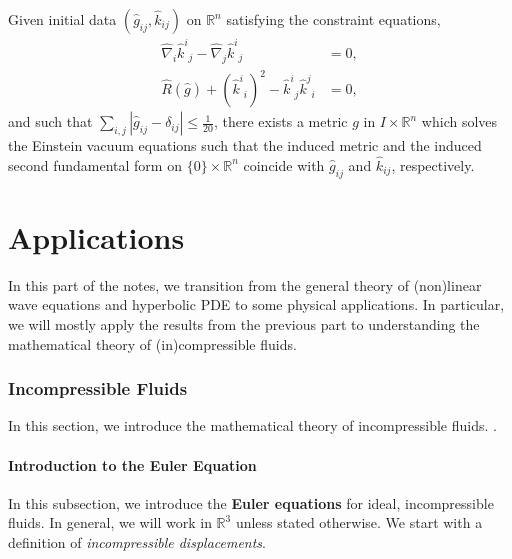 \documentclass{article}
\begin{document}
\begin{theorem}
	Given initial data $(\hat{g}_{ij}, \hat{k}_{ij})$ on $\mathbb{R}^{n}$ satisfying the constraint equations, 
	\begin{equation}
		\begin{alignedat}{1}
			\hat{\nabla}_{i}{\hat{k}^{i}}_{j} - \hat{\nabla}_{j}{\hat{k}^{i}}_{j} &= 0, \\
			\hat{R}(\hat{g}) + ({\hat{k}^{i}}_{i})^{2} - {\hat{k}^{i}}_{j}{\hat{k}^{j}}_{i} &= 0,
		\end{alignedat} 
	\end{equation}
	and such that $\sum_{i,j}|\hat{g}_{ij} - \delta_{ij}| \leq \frac{1}{20}$, there exists a metric $g$ in $I \times \mathbb{R}^{n}$ which solves the Einstein vacuum equations such that the induced metric and the induced second fundamental form on $\{0\} \times \mathbb{R}^{n}$ coincide with $\hat{g}_{ij}$ and $\hat{k}_{ij}$, respectively. 
\end{theorem} 
\newpage 

\part{Applications}
In this part of the notes, we transition from the general theory of (non)linear wave equations and hyperbolic PDE to some physical applications. In particular, we will mostly apply the results from the previous part to understanding the mathematical theory of (in)compressible fluids. 
\section{Incompressible Fluids}

In this section, we introduce the mathematical theory of incompressible fluids. \cite{Marchioro_Pulvirenti_1993}.  

\subsection{Introduction to the Euler Equation}

In this subsection, we introduce the \textbf{Euler equations} for ideal, incompressible fluids. In general, we will work in $\mathbb{R}^{3}$ unless stated otherwise. We start with a definition of \textit{incompressible displacements}. 
\end{document}

